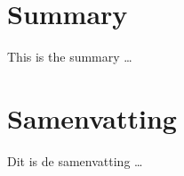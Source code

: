 



\renewcommand{\bibsection}{\chapter{Bibliography}}
\renewcommand{\bibname}{Bibliography}
\renewcommand{\bibfont}{\footnotesize}
\setlength{\bibsep}{0pt}







\chapter{Summary}

This is the summary \ldots
\chapter{Samenvatting}

Dit is de samenvatting \ldots